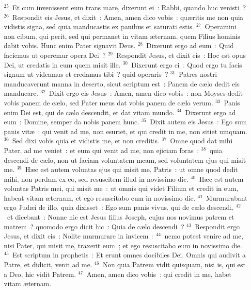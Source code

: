 ${}^{25}$~Et cum invenissent eum trans mare, dixerunt ei~: Rabbi, quando huc venisti~?
${}^{26}$~Respondit eis Jesus, et dixit~: Amen, amen dico vobis~: qu\ae ritis me non quia vidistis signa, sed quia manducastis ex panibus et saturati estis.
${}^{27}$~Operamini non cibum, qui perit, sed qui permanet in vitam \ae ternam, quem Filius hominis dabit vobis. Hunc enim Pater signavit Deus.
${}^{28}$~Dixerunt ergo ad eum~: Quid faciemus ut operemur opera Dei~?
${}^{29}$~Respondit Jesus, et dixit eis~: Hoc est opus Dei, ut credatis in eum quem misit ille.
${}^{30}$~Dixerunt ergo ei~: Quod ergo tu facis signum ut videamus et credamus tibi~? quid operaris~?
${}^{31}$~Patres nostri manducaverunt manna in deserto, sicut scriptum est~: Panem de c\ae lo dedit eis manducare.
${}^{32}$~Dixit ergo eis Jesus~: Amen, amen dico vobis~: non Moyses dedit vobis panem de c\ae lo, sed Pater meus dat vobis panem de c\ae lo verum.
${}^{33}$~Panis enim Dei est, qui de c\ae lo descendit, et dat vitam mundo.
${}^{34}$~Dixerunt ergo ad eum~: Domine, semper da nobis panem hunc.
${}^{35}$~Dixit autem eis Jesus~: Ego sum panis vit\ae~: qui venit ad me, non esuriet, et qui credit in me, non sitiet umquam.
${}^{36}$~Sed dixi vobis quia et vidistis me, et non creditis.
${}^{37}$~Omne quod dat mihi Pater, ad me veniet~: et eum qui venit ad me, non ejiciam foras~:
${}^{38}$~quia descendi de c\ae lo, non ut faciam voluntatem meam, sed voluntatem ejus qui misit me.
${}^{39}$~H\ae c est autem voluntas ejus qui misit me, Patris~: ut omne quod dedit mihi, non perdam ex eo, sed resuscitem illud in novissimo die.
${}^{40}$~H\ae c est autem voluntas Patris mei, qui misit me~: ut omnis qui videt Filium et credit in eum, habeat vitam \ae ternam, et ego resuscitabo eum in novissimo die.
${}^{41}$~Murmurabant ergo Jud\ae i de illo, quia dixisset~: Ego sum panis vivus, qui de c\ae lo descendi,
${}^{42}$~et dicebant~: Nonne hic est Jesus filius Joseph, cujus nos novimus patrem et matrem~? quomodo ergo dicit hic~: Quia de c\ae lo descendi~?
${}^{43}$~Respondit ergo Jesus, et dixit eis~: Nolite murmurare in invicem~:
${}^{44}$~nemo potest venire ad me, nisi Pater, qui misit me, traxerit eum~; et ego resuscitabo eum in novissimo die.
${}^{45}$~Est scriptum in prophetis~: Et erunt omnes docibiles Dei. Omnis qui audivit a Patre, et didicit, venit ad me.
${}^{46}$~Non quia Patrem vidit quisquam, nisi is, qui est a Deo, hic vidit Patrem.
${}^{47}$~Amen, amen dico vobis~: qui credit in me, habet vitam \ae ternam.


